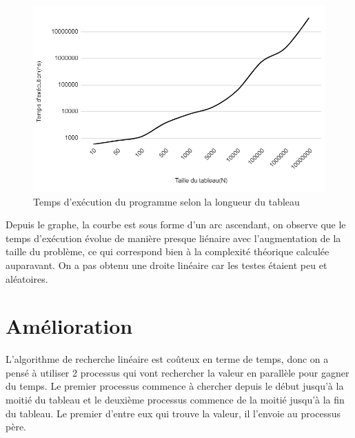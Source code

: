 \begin{figure}[H]
    \centering
        \includegraphics[scale=0.5]{./ressources/graphe_temps_execution.png}
        \caption{Temps d'exécution du programme selon la longueur du tableau}
    \label{fig:temps_exec_seq}
\end{figure}
\par
Depuis le graphe, la courbe est sous forme d'un arc ascendant, on observe que le temps d'exécution évolue de manière presque liénaire avec l'augmentation de la taille du problème, ce qui correspond bien à la complexité théorique calculée auparavant.
On a pas obtenu une droite linéaire car les testes étaient peu et aléatoires.
\section{Amélioration}
L'algorithme de recherche linéaire est coûteux en terme de temps, donc on a pensé à utiliser 2 processus qui vont rechercher la valeur en parallèle pour gagner du temps.
Le premier processus commence à chercher depuis le début jusqu'à la moitié du tableau et le deuxième processus commence de la moitié jusqu'à la fin du tableau. Le premier d'entre eux qui trouve la valeur, il l'envoie au processus père.





